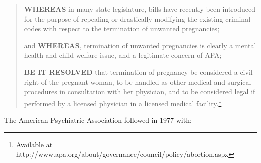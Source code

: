 \begin{quote}

\textbf{WHEREAS} in many state legislature, bills have recently been introduced for the purpose of repealing or drastically modifying the existing criminal codes with respect to the termination of unwanted pregnancies;

and \textbf{WHEREAS}, termination of unwanted pregnancies is clearly a mental health and child welfare issue, and a legitimate concern of APA;

\textbf{BE IT RESOLVED} that termination of pregnancy be considered a civil right of the pregnant woman, to be handled as other medical and surgical procedures in consultation with her physician, and to be considered legal if performed by a licensed physician in a licensed medical facility.\footnote{Available at http:\slash \slash www.apa.org\slash about\slash governance\slash council\slash policy\slash abortion.aspx}
\end{quote}

The American Psychiatric Association followed in 1977 with:

